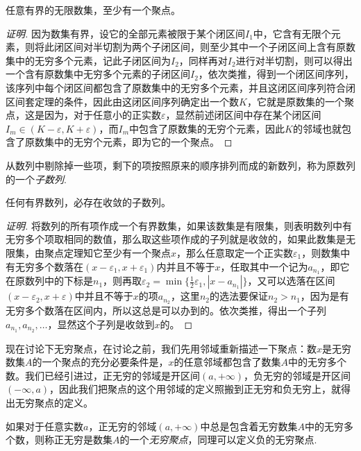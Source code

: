 \begin{theorem}
  任意有界的无限数集，至少有一个聚点。
\end{theorem}

\begin{proof}[证明]
  因为数集有界，设它的全部元素被限于某个闭区间$I_1$中，它含有无限个元素，则将此闭区间对半切割为两个子闭区间，则至少其中一个子闭区间上含有原数集中的无穷多个元素，记此子闭区间为$I_2$，同样再对$I_2$进行对半切割，则可以得出一个含有原数集中无穷多个元素的子闭区间$I_2$，依次类推，得到一个闭区间序列，该序列中每个闭区间都包含了原数集中的无穷多个元素，并且这闭区间序列符合闭区间套定理的条件，因此由这闭区间序列确定出一个数$K$，它就是原数集的一个聚点，这是因为，对于任意小的正实数$\varepsilon$，显然前述闭区间中存在某个闭区间$I_m \in (K-\varepsilon,K+\varepsilon)$，而$I_m$中包含了原数集的无穷个元素，因此$K$的邻域也就包含了原数集中的无穷个元素，即为它的一个聚点。
\end{proof}

从数列中剔除掉一些项，剩下的项按照原来的顺序排列而成的新数列，称为原数列的一个\emph{子数列}.
\begin{inference}
  任何有界数列，必存在收敛的子数列。
\end{inference}

\begin{proof}[证明]
  将数列的所有项作成一个有界数集，如果该数集是有限集，则表明数列中有无穷多个项取相同的数值，那么取这些项作成的子列就是收敛的，如果此数集是无限集，由聚点定理知它至少有一个聚点$x$，那么任意取定一个正实数$\varepsilon_1$，则数集中有无穷多个数落在$(x-\varepsilon_1,x+\varepsilon_1)$内并且不等于$x$，任取其中一个记为$a_{n_1}$，即它在原数列中的下标是$n_1$，则再取$\varepsilon_2 = \min \{ \frac{1}{2}\varepsilon_1, |x-a_{n_1}| \}$，又可以选落在区间$(x-\varepsilon_2,x+\varepsilon)$中并且不等于$x$的项$a_{n_2}$，这里$n_2$的选法要保证$n_2>n_1$，因为是有无穷多个数落在区间内，所以这总是可以办到的。依次类推，得出一个子列$a_{n_1},a_{n_2},\ldots$，显然这个子列是收敛到$x$的。
\end{proof}

现在讨论下无穷聚点，在讨论之前，我们先用邻域重新描述一下聚点：数$x$是无穷数集$A$的一个聚点的充分必要条件是，$x$的任意邻域都包含了数集$A$中的无穷多个数。我们已经引进过，正无穷的邻域是开区间$(a,+\infty)$，负无穷的邻域是开区间$(-\infty,a)$，因此我们把聚点的这个用邻域的定义照搬到正无穷和负无穷上，就得出无穷聚点的定义。

\begin{definition}
  如果对于任意实数$a$，正无穷的邻域$(a,+\infty)$中总是包含着无穷数集$A$中的无穷多个数，则称正无穷是数集$A$的一个\emph{无穷聚点}，同理可以定义负的无穷聚点. 
\end{definition}

